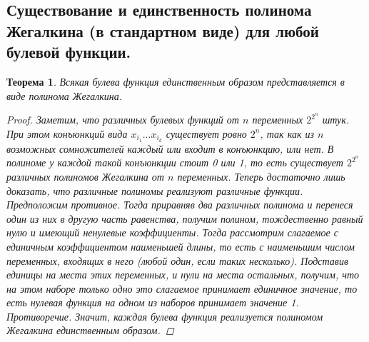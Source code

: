 \documentclass{article}
\newtheorem{theorem}{Теорема}
\begin{document}
\subsection{Существование и единственность полинома Жегалкина (в стандартном виде) для любой булевой функции.}
\begin{theorem}
Всякая булева функция единственным образом представляется в виде полинома Жегалкина.
\begin{proof}
Заметим, что различных булевых функций от $n$ переменных $2^{2^n}$ штук. При этом конъюнкций вида $x_{i_1}...x_{i_k}$ существует ровно $2^n$, так как из $n$ возможных сомножителей каждый или входит в конъюнкцию, или нет. В полиноме у каждой такой конъюнкции стоит 0 или 1, то есть существует $2^{2^n}$ различных полиномов Жегалкина от $n$ переменных.
\newline
\newline
Теперь достаточно лишь доказать, что различные полиномы реализуют различные функции. Предположим противное. Тогда приравняв два различных полинома и перенеся один из них в другую часть равенства, получим полином, тождественно равный нулю и имеющий ненулевые коэффициенты. Тогда рассмотрим слагаемое с единичным коэффициентом наименьшей длины, то есть с наименьшим числом переменных, входящих в него (любой один, если таких несколько). Подставив единицы на места этих переменных, и нули на места остальных, получим, что на этом наборе только одно это слагаемое принимает единичное значение, то есть нулевая функция на одном из наборов принимает значение 1. Противоречие. Значит, каждая булева функция реализуется полиномом Жегалкина единственным образом.
\end{proof}
\end{theorem}
\end{document}

